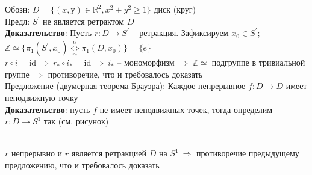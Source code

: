 	Обозн: $D = \{(x,у)\in \mathbb{R}^2, x^2+y^2\geq1\}$ диск (круг)\\
	Предл: $S^{\prime}$ не является ретрактом $D$\\
	\textbf{Доказательство}: Пусть $r: D \rightarrow S^{\prime}$ -- ретракция. Зафиксируем $x_0 \in S^{\prime}$; $\mathbb{Z} \simeq \{\pi_1 (S^{\prime},x_0) \overset{i_*}{\underset{r_*}{\Leftrightarrow}} \pi_1 (D,x_0)\} = \{e\}$\\
	$r \circ i =  \text{id}\ \Rightarrow\ r_* \circ i_* =  \text{id}\ \Rightarrow\ i_*$ -- мономорфизм $\Rightarrow\ \mathbb{Z} \simeq$ подгруппе в тривиальной группе $\Rightarrow$ противоречие, что и требовалось доказать\\
	Предложение (двумерная теорема Брауэра): Каждое непрерывное $f: D\rightarrow D$ имеет неподвижную точку\\
	\textbf{Доказательство}: пусть $f$ не имеет неподвижных точек, тогда определим $r: D\rightarrow S^1$ так (см. рисунок)\\
	\begin{figure}[h]
	\end{figure}\\
	$r$ непрерывно и $r$ является ретракцией $D$ на $S^1\ \Rightarrow$ противоречие предыдущему предложению, что и требовалось доказать



\newpage

